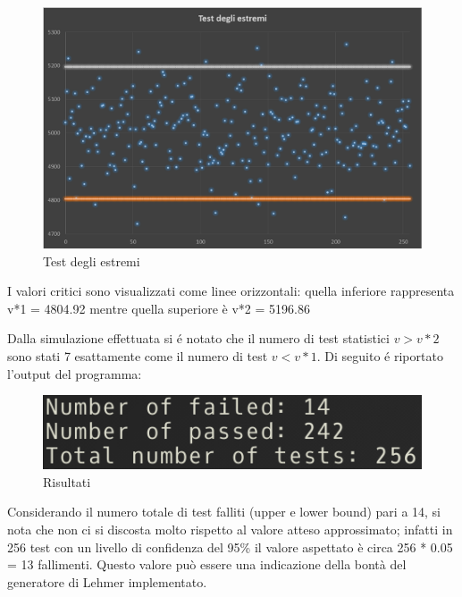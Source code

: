 \begin{figure}[H]
 \begin{center}
  \includegraphics[scale=0.45]{img/test.png}
  \caption[Test degli estremi]{Test degli estremi}
  \end{center}
\end{figure}

\vspace{0.5cm}
I valori critici sono visualizzati come linee orizzontali: quella inferiore rappresenta
v*1 = 4804.92 mentre quella superiore è v*2 = 5196.86

Dalla simulazione effettuata si \'e notato che il numero di test statistici $v > v*2$ sono stati 7 
esattamente come il numero di test $v < v*1$. Di seguito \'e riportato l’output del programma:

\begin{figure}[H]
  \begin{center}
  \includegraphics[scale=0.7]{img/test_estremi.png}
  \caption[Risultati]{Risultati}
  \end{center}
\end{figure}


Considerando il numero totale di test falliti (upper e lower bound) pari a 14, si nota che non
ci si discosta molto rispetto al valore atteso approssimato; infatti in 256 test con un livello di
confidenza del 95\% il valore aspettato è circa 256 * 0.05 = 13 fallimenti. Questo valore pu\`o 
essere una indicazione della bont\`a del generatore di Lehmer implementato.
